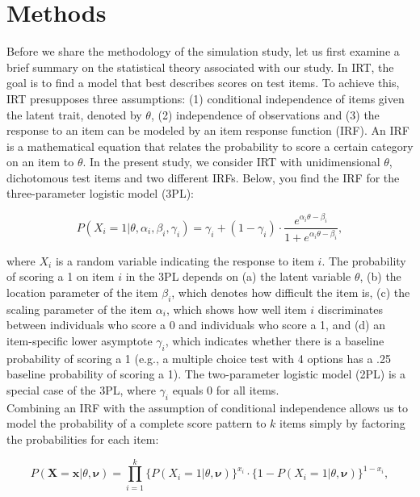 \documentclass[Royal,sageapa,times,doublespace]{sagej}
\begin{document}
\section{Methods}
Before we share the methodology of the simulation study, let us first examine a brief summary on the statistical theory associated with our study. In IRT, the goal is to find a model that best describes scores on test items. To achieve this, IRT presupposes three assumptions: (1) conditional independence of items given the latent trait, denoted by $\theta$, (2) independence of observations and (3) the response to an item can be modeled by an item response function (IRF). An IRF is a mathematical equation that relates the probability to score a certain category on an item to $\theta$. In the present study, we consider IRT with unidimensional $\theta$, dichotomous test items and two different IRFs. Below, you find the IRF for the three-parameter logistic model (3PL):

\begin{equation}
P(X_i = 1 | \theta, \alpha_{i}, \beta_{i}, \gamma_{i}) = \gamma_{i} + (1 - \gamma_{i}) \cdot 
\frac{e^{\alpha_{i}\theta - \beta_{i}}}{1 + e^{\alpha_{i}\theta - \beta_{i}}},
\end{equation}

where $X_i$ is a random variable indicating the response to item $i$. The probability of scoring a 1 on item $i$ in the 3PL depends on (a) the latent variable $\theta$, (b) the location parameter of the item $\beta_{i}$, which denotes how difficult the item is, (c) the scaling parameter of the item $\alpha_{i}$, which shows how well item $i$ discriminates between individuals who score a 0 and individuals who score a 1, and (d) an item-specific lower asymptote $\gamma_{i}$, which indicates whether there is a baseline probability of scoring a 1 (e.g., a multiple choice test with 4 options has a .25 baseline probability of scoring a 1). The two-parameter logistic model (2PL) is a special case of the 3PL, where $\gamma_{i}$ equals 0 for all items. \\
\indent Combining an IRF with the assumption of conditional independence allows us to model the probability of a complete score pattern to $k$ items simply by factoring the probabilities for each item:

\begin{equation}
P(\boldsymbol{X} = \boldsymbol{x} | \theta, \boldsymbol{\nu}) = \prod_{i=1}^{k} \{P(X_i = 1 | \theta, \boldsymbol{\nu})\}^{x_i} \cdot  \{1 - P(X_i = 1 | \theta, \boldsymbol{\nu}) \}^{1 - x_i},
\end{equation}
\end{document}
